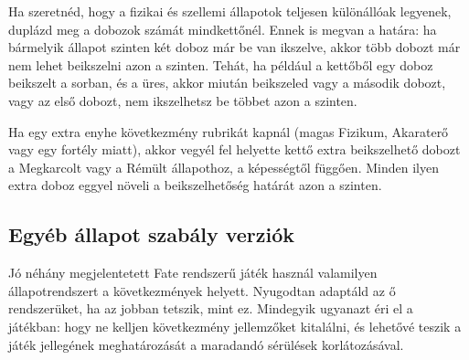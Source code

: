 Ha szeretnéd, hogy a fizikai és szellemi állapotok teljesen különállóak legyenek, duplázd meg a dobozok számát mindkettőnél. Ennek is megvan a határa: ha bármelyik állapot szinten két doboz már be van ikszelve, akkor több dobozt már nem lehet beikszelni azon a szinten. Tehát, ha például a kettőből egy doboz beikszelt a  sorban, és a  üres, akkor miután beikszeled vagy a második  dobozt, vagy az első  dobozt, nem ikszelhetsz be többet azon a szinten.

Ha egy extra enyhe következmény rubrikát kapnál (magas Fizikum, Akaraterő vagy egy fortély miatt), akkor vegyél fel helyette kettő extra beikszelhető dobozt a Megkarcolt vagy a Rémült állapothoz, a képességtől függően. Minden ilyen extra doboz eggyel növeli a beikszelhetőség határát azon a szinten.

\subsection{Egyéb állapot szabály verziók}

Jó néhány megjelentetett Fate rendszerű játék használ valamilyen állapotrendszert a következmények helyett. Nyugodtan adaptáld az ő rendszerüket, ha az jobban tetszik, mint ez. Mindegyik ugyanazt éri el a játékban: hogy ne kelljen következmény jellemzőket kitalálni, és lehetővé teszik a játék jellegének meghatározását a maradandó sérülések korlátozásával.
